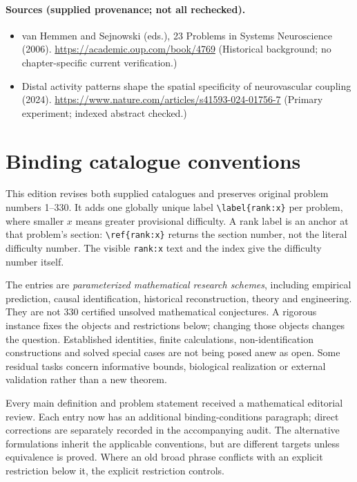 \documentclass[11pt]{article}
\begin{document}
\paragraph{Sources (supplied provenance; not all rechecked).} \begin{itemize}
\item van Hemmen and Sejnowski (eds.), 23 Problems in Systems Neuroscience (2006). \url{https://academic.oup.com/book/4769} (Historical background; no chapter-specific current verification.)
\item Distal activity patterns shape the spatial specificity of neurovascular coupling (2024). \url{https://www.nature.com/articles/s41593-024-01756-7} (Primary experiment; indexed abstract checked.)
\end{itemize}


\section*{Binding catalogue conventions}
This edition revises both supplied catalogues and preserves original problem numbers 1--330. It adds one globally unique label \verb|\label{rank:x}| per problem, where smaller $x$ means greater provisional difficulty. A rank label is an anchor at that problem's section: \verb|\ref{rank:x}| returns the section number, not the literal difficulty number. The visible \texttt{rank:x} text and the index give the difficulty number itself.

The entries are \emph{parameterized mathematical research schemes}, including empirical prediction, causal identification, historical reconstruction, theory and engineering. They are not 330 certified unsolved mathematical conjectures. A rigorous instance fixes the objects and restrictions below; changing those objects changes the question. Established identities, finite calculations, non-identification constructions and solved special cases are not being posed anew as open. Some residual tasks concern informative bounds, biological realization or external validation rather than a new theorem.

Every main definition and problem statement received a mathematical editorial review. Each entry now has an additional binding-conditions paragraph; direct corrections are separately recorded in the accompanying audit. The alternative formulations inherit the applicable conventions, but are different targets unless equivalence is proved. Where an old broad phrase conflicts with an explicit restriction below it, the explicit restriction controls.
\end{document}
